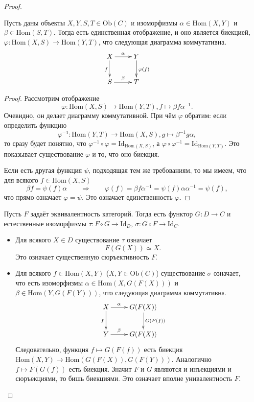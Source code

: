\documentclass[12pt,a4paper]{article}
\newcommand{\Id}{\mathrm{Id}}
\newcommand{\Hom}{\mathrm{Hom}}
\newcommand{\Ob}{\mathrm{Ob}}
\begin{document}
    \begin{proof}
        \begin{thlemma}
            Пусть даны объекты $X, Y, S, T \in \Ob(C)$ и изоморфизмы $\alpha \in \Hom(X, Y)$ и $\beta \in \Hom(S, T)$. Тогда есть единственная отображение, и оно является биекцией, $\varphi: \Hom(X, S) \to \Hom(Y, T)$, что следующая диаграмма коммутативна.
            \[
                \xymatrix{
                    X \ar[r]^{\alpha} \ar[d]_{f}& Y \ar[d]^{\varphi(f)}\\
                    S \ar[r]^{\beta}& T
                }
            \]
        \end{thlemma}

        \begin{proof}
            Рассмотрим отображение
            \[\varphi: \Hom(X, S) \to \Hom(Y, T), f \mapsto \beta f \alpha^{-1}.\]
            Очевидно, он делает диаграмму коммутативной. При чём $\varphi$ обратим: если определить функцию
            \[\varphi^{-1}: \Hom(Y, T) \to \Hom(X, S), g \mapsto \beta^{-1} g \alpha,\]
            то сразу будет понятно, что $\varphi^{-1} \circ \varphi = \Id_{\Hom(X, S)}$, а $\varphi \circ \varphi^{-1} = \Id_{\Hom(Y, T)}$. Это показывает существование $\varphi$ и то, что оно биекция.

            Если есть другая функция $\psi$, подходящая тем же требованиям, то мы имеем, что для всякого $f \in \Hom(X, S)$
            \[
                \beta f = \psi(f) \alpha
                \qquad \Longrightarrow \qquad
                \varphi(f) = \beta f \alpha^{-1} = \psi(f) \alpha \alpha^{-1} = \psi(f),
            \]
            что прямо означает $\varphi = \psi$. Это означает единственность $\varphi$.
        \end{proof}

        Пусть $F$ задаёт эквивалентность категорий. Тогда есть функтор $G: D \to C$ и естественные изоморфизмы $\tau: F \circ G \to \Id_D$, $\sigma: G \circ F \to \Id_C$.
        \begin{itemize}
            \item Для всякого $X \in D$ существование $\tau$ означает
                \[F(G(X)) \simeq X.\]
                Это означает существенную сюръективность $F$.
            \item Для всякого $f \in \Hom(X, Y)$ ($X, Y \in \Ob(C)$) существование $\sigma$ означает, что есть изоморфизмы $\alpha \in \Hom(X, G(F(X)))$ и $\beta \in \Hom(Y, G(F(Y)))$, что следующая диаграмма коммутативна.
                \[
                    \xymatrix{
                        X \ar[r]^(0.35){\alpha} \ar[d]_{f}& G(F(X)) \ar[d]^{G(F(f))}\\
                        Y \ar[r]^(0.35){\beta}& G(F(X))
                    }
                \]
                Следовательно, функция $f \mapsto G(F(f))$ есть биекция $\Hom(X, Y) \to \Hom(G(F(X)), G(F(Y)))$. Аналогично $f \mapsto F(G(f))$ есть биекция. Значит $F$ и $G$ являются и инъекциями и сюръекциями, то бишь биекциями. Это означает вполне унивалентность $F$.
        \end{itemize}


\end{proof}
\end{document}
